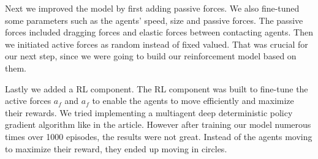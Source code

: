 \documentclass[9pt]{pnas-new}
\begin{document}
Next we improved the model by first adding passive forces. We also fine-tuned some parameters such as the agents' speed, size and passive forces. 
The passive forces included dragging forces and elastic forces between contacting agents.
Then we initiated active forces as random instead of fixed valued. That was crucial for our next step, since we were going to build our reinforcement model based on them.

Lastly we added a RL component. The RL component was built to fine-tune the active forces $a_f$ and $a_f$ to enable the agents to move efficiently and maximize their rewards. We tried implementing a multiagent deep deterministic policy gradient algorithm like in the article. However after training our model numerous times over 1000 episodes, the results were not great. Instead of the agents moving to maximize their reward, they ended up moving in circles.
\end{document}
